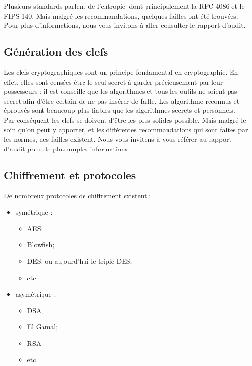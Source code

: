 Plusieurs standards parlent de l'entropie, dont principalement la RFC 4086 et le FIPS 140. Mais malgré les recommandations, quelques failles ont été trouvées. Pour plus d'informations, nous vous invitons à aller consulter le rapport d'audit.

\subsection{Génération des clefs}

Les clefs cryptographiques sont un principe fondamental en cryptographie. En effet, elles sont censées être le seul secret à garder précieusement par leur possesseurs : il est conseillé que les algorithmes et tous les outils ne soient pas secret afin d'être certain de ne pas insérer de faille. Les algorithme reconnus et éprouvés sont beaucoup plus fiables que les algorithmes secrets et personnels.\\

Par conséquent les clefs se doivent d'être les plus solides possible. Mais malgré le soin qu'on peut y apporter, et les différentes recommandations qui sont faites par les normes, des failles existent. Nous vous invitons à vous référer au rapport d'audit pour de plus amples informations.

\subsection{Chiffrement et protocoles}
De nombreux protocoles de chiffrement existent : 
\begin{itemize}
	\item symétrique :
	\begin {itemize}
		\item AES;
		\item Blowfish;
		\item DES, ou aujourd'hui le triple-DES;
		\item etc.\\
	\end{itemize}
	\item asymétrique : 
	\begin {itemize}
		\item DSA;
		\item El Gamal;
		\item RSA;
		\item etc.\\
	\end{itemize}
\end{itemize}

